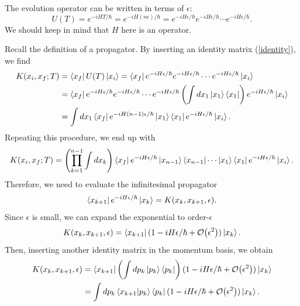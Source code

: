 \documentclass[12pt,a4paper]{article}
\begin{document}
The evolution operator can be written in terms of $\epsilon$:
\begin{equation}
    U(T) = e^{-iHT/\hbar} = e^{-iH(n\epsilon)/\hbar} = e^{-iH\epsilon/\hbar} e^{-iH\epsilon/\hbar} \cdots e^{-iH\epsilon/\hbar}.
\end{equation}
We should keep in mind that $H$ here is an operator.

Recall the definition of a propagator. By inserting an identity matrix (\ref{identity}), we find
\begin{equation}
\begin{aligned}
    K(x_i,x_f;T) &= \bra{x_f}U(T)\ket{x_i}  = \bra{x_f}e^{-iH\epsilon/\hbar} e^{-iH\epsilon/\hbar} \cdots e^{-iH\epsilon/\hbar}\ket{x_i}\\
    &=\bra{x_f}e^{-iH\epsilon/\hbar}e^{-iH\epsilon/\hbar}\cdots e^{-iH\epsilon/\hbar}\left(\int dx_1\ket{x_1}\bra{x_1}\right)e^{-iH\epsilon/\hbar}\ket{x_i}\\
    &=\int dx_1\bra{x_f}e^{-iH(n-1)\epsilon/\hbar}\ket{x_1}\bra{x_1}e^{-iH\epsilon/\hbar}\ket{x_i}.
\end{aligned}
\end{equation}
Repeating this procedure, we end up with
\begin{equation}
    K(x_i,x_f;T) = \left(\prod_{k=1}^{n-1}\int dx_k\right)\bra{x_f}e^{-iH\epsilon/\hbar}\ket{x_{n-1}}\bra{x_{n-1}}\cdots\ket{x_1}\bra{x_1}e^{-iH\epsilon/\hbar}\ket{x_i}.
    \label{eq}
\end{equation}
Therefore, we need to evaluate the infinitesimal propagator
\begin{equation}
    \bra{x_{k+1}}e^{-iH\epsilon/\hbar}\ket{x_{k}} = K(x_{k},x_{k+1},\epsilon).
\end{equation}
Since $\epsilon$ is small, we can expand the exponential to order-$\epsilon$
\begin{equation}
    K(x_{k},x_{k+1},\epsilon) = \bra{x_{k+1}}(1-iH\epsilon/\hbar + \order{\epsilon^2})\ket{x_{k}}.
\end{equation}
Then, inserting another identity matrix in the momentum basis, we obtain
\begin{equation}
\begin{aligned}
        K(x_{k},x_{k+1},\epsilon) &= \bra{x_{k+1}}\left(\int dp_k \ket{p_k}\bra{p_k}\right)(1-iH\epsilon/\hbar + \order{\epsilon^2})\ket{x_{k}} \\
        &= \int dp_k \braket{x_{k+1}}{p_k}\bra{p_k}(1-iH\epsilon/\hbar + \order{\epsilon^2})\ket{x_{k}}.
        \label{k}
\end{aligned}
\end{equation}
\end{document}

